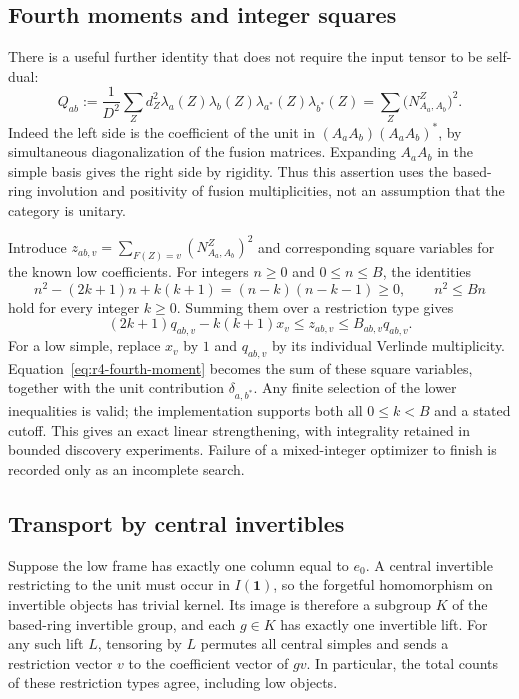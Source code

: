 \subsection{Fourth moments and integer squares}
There is a useful further identity that does not require the input tensor
to be self-dual:
\begin{equation}\label{eq:r4-fourth-moment}
 Q_{ab}:=\frac1{D^2}\sum_Z d_Z^2
  \lambda_a(Z)\lambda_b(Z)\lambda_{a^*}(Z)\lambda_{b^*}(Z)
 =\sum_Z\bigl(N_{A_a,A_b}^Z\bigr)^2.
\end{equation}
Indeed the left side is the coefficient of the unit in
$(A_aA_b)(A_aA_b)^*$, by simultaneous diagonalization of the fusion matrices.
Expanding $A_aA_b$ in the simple basis gives the right side by rigidity.
Thus this assertion uses the based-ring involution and positivity of fusion
multiplicities, not an assumption that the category is unitary.

Introduce $z_{ab,v}=\sum_{F(Z)=v}(N_{A_a,A_b}^Z)^2$ and corresponding
square variables for the known low coefficients. For integers $n\ge0$ and
$0\le n\le B$, the identities
\[
 n^2-(2k+1)n+k(k+1)=(n-k)(n-k-1)\ge0,
 \qquad n^2\le Bn
\]
hold for every integer $k\ge0$. Summing them over a restriction type gives
\begin{equation}\label{eq:r4-square-cuts}
 (2k+1)q_{ab,v}-k(k+1)x_v\le z_{ab,v}
          \le B_{ab,v}q_{ab,v}.
\end{equation}
For a low simple, replace $x_v$ by $1$ and $q_{ab,v}$ by its individual
Verlinde multiplicity. Equation~\eqref{eq:r4-fourth-moment} becomes the sum
of these square variables, together with the unit contribution
$\delta_{a,b^*}$. Any finite selection of the lower inequalities is valid;
the implementation supports both all $0\le k<B$ and a stated cutoff.
This gives an exact linear strengthening, with integrality retained in
bounded discovery experiments. Failure of a mixed-integer optimizer to
finish is recorded only as an incomplete search.

\subsection{Transport by central invertibles}
Suppose the low frame has exactly one column equal to $e_0$.
A central invertible restricting to the unit must occur in $I(\mathbf1)$,
so the forgetful homomorphism on invertible objects has trivial kernel.
Its image is therefore a subgroup $K$ of the based-ring invertible group,
and each $g\in K$ has exactly one invertible lift.
For any such lift $L$, tensoring by $L$ permutes all central simples and sends
a restriction vector $v$ to the coefficient vector of $gv$. In particular,
the total counts of these restriction types agree, including low objects.

